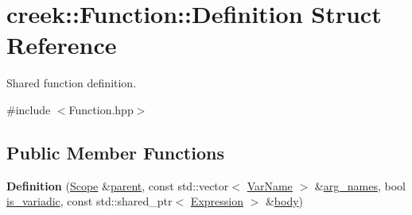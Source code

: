 \hypertarget{structcreek_1_1_function_1_1_definition}{}\section{creek\+:\+:Function\+:\+:Definition Struct Reference}
\label{structcreek_1_1_function_1_1_definition}


Shared function definition.  




{\ttfamily \#include $<$Function.\+hpp$>$}

\subsection*{Public Member Functions}
\begin{DoxyCompactItemize}
\item 
{\bfseries Definition} (\hyperlink{classcreek_1_1_scope}{Scope} \&\hyperlink{structcreek_1_1_function_1_1_definition_a7758a340c48471dbc8466ff587cb66ab}{parent}, const std\+::vector$<$ \hyperlink{classcreek_1_1_var_name}{Var\+Name} $>$ \&\hyperlink{structcreek_1_1_function_1_1_definition_ada7202b71b79c370d50da09fd6ed847e}{arg\+\_\+names}, bool \hyperlink{structcreek_1_1_function_1_1_definition_aa1caeec6ab3ec9691487f79c2e4a2873}{is\+\_\+variadic}, const std\+::shared\+\_\+ptr$<$ \hyperlink{classcreek_1_1_expression}{Expression} $>$ \&\hyperlink{structcreek_1_1_function_1_1_definition_a13aad3e809a8c20295da20940f8e227f}{body})\hypertarget{structcreek_1_1_function_1_1_definition_a0ece9437e284c0567e56f6376b6bd696}{}\label{structcreek_1_1_function_1_1_definition_a0ece9437e284c0567e56f6376b6bd696}

\end{DoxyCompactItemize}
